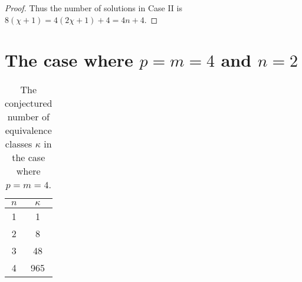 \documentclass[12pt]{article}
\theoremstyle{definition}
\theoremstyle{remark}
\numberwithin{equation}{section}
\begin{document}
\begin{proof}
Thus the number of solutions in Case II is \( 8(\chi + 1) = 4 ( 2\chi + 1) + 4 = 4n + 4 \).
\end{proof}




\section{The case where \(p = m = 4\) and \(n = 2\)}





\begin{table}[h]

\label{table:4D}


\begin{center}


\begin{tabular}{ c | c }
 \( n \) & \( \kappa \) \\
\hline\hline
 1 & 1 \\
\hline
 2 & 8 \\
\hline
 3 & 48 \\
\hline
 4 & 965 
\end{tabular}





\end{center}
\caption{
The conjectured number of equivalence
classes \( \kappa \)  
in the case where \(p = m = 4\).
 }

\end{table}
\end{document}
